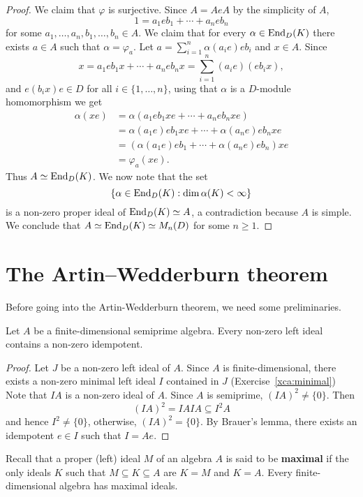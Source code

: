 \begin{proof}
    We claim that $\varphi$ is surjective. Since 
    $A=AeA$ by the simplicity of $A$,
    \[
	1=a_1eb_1+\cdots+a_neb_n
	\]
    for some $a_1,\dots,a_n,b_1,\dots,b_n\in A$. 
    We claim that for every $\alpha\in\operatorname{End}_D(K)$
    there exists $a\in A$ such that 
    $\alpha=\varphi_a$.  
	Let $a=\sum_{i=1}^n\alpha(a_ie)eb_i$ and $x\in A$. Since 
    \[
    x=a_1eb_1x+\cdots+a_neb_nx=\sum_{i=1}^n(a_ie)(eb_ix), 
    \]
    and $e(b_ix)e\in D$ for all $i\in\{1,\dots,n\}$, using 
    that $\alpha$ is a $D$-module homomorphism we get 
    \begin{align*}
        \alpha(xe)&=\alpha(a_1eb_1xe+\cdots+a_neb_nxe)\\
        &=\alpha(a_1e)eb_1xe+\cdots+\alpha(a_ne)eb_nxe\\
        &=\left(\alpha(a_1e)eb_1+\cdots+\alpha(a_ne)eb_n\right)xe\\
        &=\varphi_a(xe).
    \end{align*}
    Thus $A\simeq\operatorname{End}_D(K)$. 
    We now note that the set 
    \[
	\{\alpha\in\operatorname{End}_D(K):\dim\alpha(K)<\infty\}
	\]
    is a non-zero proper ideal of $\operatorname{End}_D(K)\simeq A$, a contradiction
    because $A$ is simple. We conclude that 
     $A\simeq\operatorname{End}_D(K)\simeq M_n(D)$ for some $n\geq1$. 
\end{proof}

\section{The Artin--Wedderburn theorem}

Before going into the Artin-Wedderburn theorem, 
we need some preliminaries. 

\begin{lemma}
    \label{lem:idempotents}
    Let $A$ be a finite-dimensional semiprime algebra. Every 
    non-zero left ideal contains a non-zero idempotent. 
\end{lemma}

\begin{proof}
Let $J$ be a non-zero left ideal of $A$. 
Since $A$ is finite-dimensional, there exists a non-zero 
minimal left ideal $I$ contained in $J$ (Exercise~\ref{xca:minimal})
Note that $IA$ is a non-zero ideal of $A$. 
Since $A$ 
is semiprime, $(IA)^2\ne\{0\}$. Then 
\[
(IA)^2=IAIA\subseteq I^2A
\]
and hence 
$I^2\ne\{0\}$, otherwise, $(IA)^2=\{0\}$. By Brauer's lemma, there exists an idempotent 
$e\in I$ such that $I=Ae$. 
\end{proof}

Recall that a proper (left) ideal $M$ of an algebra $A$ is said to be \textbf{maximal} 
if the only ideals $K$ such that $M\subseteq K\subseteq A$ are $K=M$ and $K=A$. Every
finite-dimensional algebra has maximal ideals. 

